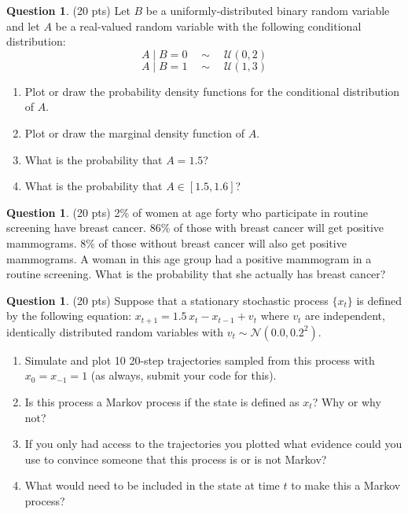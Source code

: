 \documentclass{article}
\theoremstyle{definition}
\newtheorem{question}[thm]{Question}
\begin{document}
\begin{question} (20 pts)
    Let $B$ be a uniformly-distributed binary random variable and let $A$ be a real-valued random variable with the following conditional distribution:
    $$A \mid B=0 \quad \sim \quad \mathcal{U}(0,2)$$
    $$A \mid B=1 \quad \sim \quad \mathcal{U}(1,3)$$
    \begin{enumerate}[nosep,label=(\alph*)]
        \item Plot or draw the probability density functions for the conditional distribution of $A$.
        \item Plot or draw the marginal density function of $A$.
        \item What is the probability that $A=1.5$?
        \item What is the probability that $A \in [1.5, 1.6]$?
    \end{enumerate}
\end{question}

\begin{question} (20 pts)
    2\% of women at age forty who participate in routine screening have breast cancer. 86\% of those with breast cancer will get positive mammograms. 8\% of those without breast cancer will also get positive mammograms. A woman in this age group had a positive mammogram in a routine screening. What is the probability that she actually has breast cancer?
\end{question}

\begin{question} (20 pts)
Suppose that a stationary stochastic process $\{x_t\}$ is defined by the following equation: $x_{t+1} = 1.5 \, x_t - x_{t-1} + v_{t}$ where $v_t$ are independent, identically distributed random variables with $v_t \sim \mathcal{N}(0.0, 0.2^2)$.
    \begin{enumerate}[nosep,label=(\alph*)]
        \item Simulate and plot 10 20-step trajectories sampled from this process with $x_0 = x_{-1} = 1$ (as always, submit your code for this).
        \item Is this process a Markov process if the state is defined as $x_t$? Why or why not?
        \item If you only had access to the trajectories you plotted what evidence could you use to convince someone that this process is or is not Markov?
        \item What would need to be included in the state at time $t$ to make this a Markov process?
    \end{enumerate}
\end{question}
\end{document}
